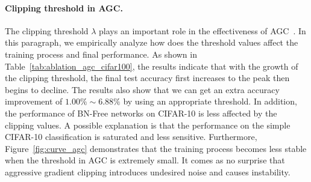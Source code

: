 \documentclass[final]{cvpr}
\begin{document}
\paragraph{Clipping threshold in AGC.} \label{sec:agc} The clipping threshold $\lambda$ plays an important role in the effectiveness of AGC~\cite{brock2021agc}. In this paragraph, we empirically analyze how does the threshold values affect the training process and final performance. As shown in Table~\ref{tab:ablation_agc_cifar100}, the results indicate that with the growth of the clipping threshold, the final test accuracy first increases to the peak then begins to decline. The results also show that we can get an extra accuracy improvement of $1.00\% \sim 6.88\%$ by using an appropriate threshold. In addition, the performance of BN-Free networks on CIFAR-10 is less affected by the clipping values. A possible explanation is that the performance on the simple CIFAR-10 classification is saturated and less sensitive. Furthermore, Figure~\ref{fig:curve_agc} demonstrates that the training process becomes less stable when the threshold in AGC is extremely small. It comes as no surprise that aggressive gradient clipping introduces undesired noise and causes instability.

\begin{table}[t]
\caption{Ablation study of the separate effect of scaled weight standardization and normalizer-free block on CIFAR-10 and CIFAR-100 with two binary networks based on ReActNet. Test accuracies are reported.}
\label{tab:ablation_nf_cifar}
\centering
{}
\end{table}
\end{document}
